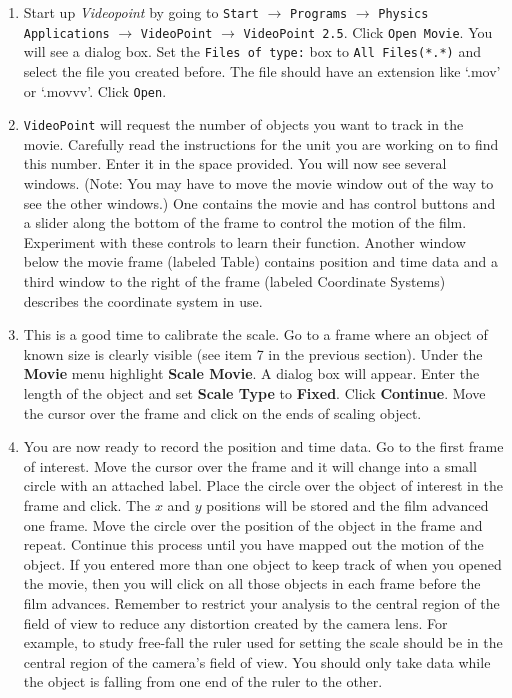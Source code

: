 \begin{enumerate}

\item Start up {\it Videopoint} by
going to {\tt Start} $\rightarrow$ {\tt Programs} $\rightarrow$
{\tt Physics Applications} $\rightarrow$ {\tt VideoPoint}
$\rightarrow$ {\tt VideoPoint 2.5}.
Click {\tt Open Movie}. You will see a dialog box. Set the {\tt Files of type:}
box to {\tt All Files(*.*)} and select the file you created before.
The file should have an extension like `.mov' or `.movvv'.
Click {\tt Open}.

\item {\tt VideoPoint} will request the number of objects you want to
track in the movie. Carefully read the instructions for the unit you
are working on to find this number. Enter it in the space provided.
You will now see several windows. 
(Note: You may have to move the movie window out of the way to see the
other windows.) One contains the movie and has control
buttons and a slider along the bottom of the frame to control the
motion of the film. Experiment with these controls to learn their
function. Another window below the movie frame (labeled Table) contains position 
and time data and a third window to the right of the frame (labeled Coordinate
Systems) describes the coordinate system in use.

\item This is a good time to calibrate the scale. Go to a frame where an
object of known size is clearly visible (see item 7
in the previous
section). Under the \textbf{Movie} menu highlight \textbf{Scale Movie}.
A dialog box will appear. Enter the length of the object and set \textbf{Scale
Type} to \textbf{Fixed}. Click \textbf{Continue}. Move the cursor
over the frame and click on the ends of scaling object.

\item You are now ready to record the position and time data. Go to the
first frame of interest. Move the cursor over the frame and it will
change into a small circle with an attached label. Place the circle
over the object of interest in the frame and click. The $x$ and $y$ positions
will be stored and the film advanced one frame. Move the circle over
the position of the object in the frame and repeat. Continue this
process until you have mapped out the motion of the object. If you
entered more than one object to keep track of when you opened the
movie, then you will click on all those objects in each frame before
the film advances.
Remember to restrict your analysis to the central region of the field of view to
reduce any distortion created by the camera lens.
For example, to study free-fall the ruler used for setting the scale should be in the
central region of the camera's field of view. You should only take data while the object is falling from one
end of the ruler to the other.


\end{enumerate}
